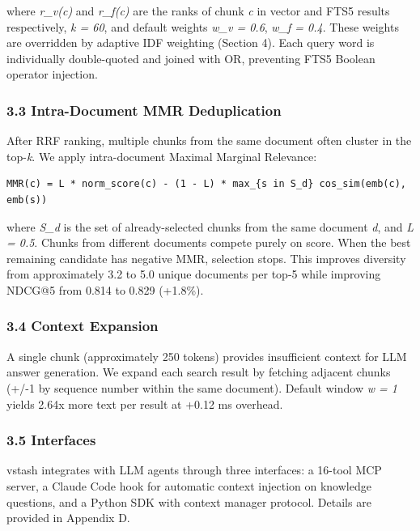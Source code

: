\documentclass[
  11pt]{article}
\begin{document}
where \emph{r\_v(c)} and \emph{r\_f(c)} are the ranks of chunk \emph{c} in vector and FTS5 results respectively, \emph{k = 60}, and default weights \emph{w\_v = 0.6}, \emph{w\_f = 0.4}. These weights are overridden by adaptive IDF weighting (Section 4). Each query word is individually double-quoted and joined with OR, preventing FTS5 Boolean operator injection.

\subsubsection{3.3 Intra-Document MMR Deduplication}\label{intra-document-mmr-deduplication}

After RRF ranking, multiple chunks from the same document often cluster in the top-\emph{k}. We apply intra-document Maximal Marginal Relevance:

\begin{verbatim}
MMR(c) = L * norm_score(c) - (1 - L) * max_{s in S_d} cos_sim(emb(c), emb(s))
\end{verbatim}

where \emph{S\_d} is the set of already-selected chunks from the same document \emph{d}, and \emph{L = 0.5}. Chunks from different documents compete purely on score. When the best remaining candidate has negative MMR, selection stops. This improves diversity from approximately 3.2 to 5.0 unique documents per top-5 while improving NDCG@5 from 0.814 to 0.829 (+1.8\%).

\subsubsection{3.4 Context Expansion}\label{context-expansion}

A single chunk (approximately 250 tokens) provides insufficient context for LLM answer generation. We expand each search result by fetching adjacent chunks (+/-1 by sequence number within the same document). Default window \emph{w = 1} yields 2.64x more text per result at +0.12 ms overhead.

\subsubsection{3.5 Interfaces}\label{interfaces}

vstash integrates with LLM agents through three interfaces: a 16-tool MCP server, a Claude Code hook for automatic context injection on knowledge questions, and a Python SDK with context manager protocol. Details are provided in Appendix D.
\end{document}
